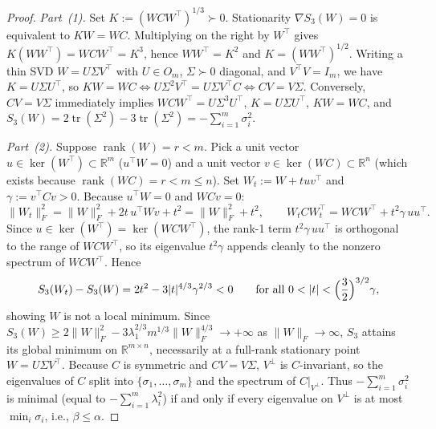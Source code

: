 \documentclass[11pt]{article}
\theoremstyle{plain}
\theoremstyle{definition}
\theoremstyle{remark}
\DeclareMathOperator{\tr}{tr}
\DeclareMathOperator{\rank}{rank}
\begin{document}
\begin{proof}
\emph{Part~(1).} Set $K := (WCW^\top)^{1/3} \succ 0$. Stationarity $\nabla S_3(W) = 0$ is equivalent to $KW = WC$. Multiplying on the right by $W^\top$ gives $K(WW^\top) = WCW^\top = K^3$, hence $WW^\top = K^2$ and $K = (WW^\top)^{1/2}$. Writing a thin SVD $W = U \Sigma V^\top$ with $U \in O_m$, $\Sigma \succ 0$ diagonal, and $V^\top V = I_m$, we have $K = U\Sigma U^\top$, so $KW = WC \iff U\Sigma^2 V^\top = U\Sigma V^\top C \iff CV = V\Sigma$. Conversely, $CV = V\Sigma$ immediately implies $WCW^\top = U\Sigma^3 U^\top$, $K = U\Sigma U^\top$, $KW = WC$, and $S_3(W) = 2\tr(\Sigma^2) - 3\tr(\Sigma^2) = -\sum_{i=1}^m \sigma_i^2$.

\emph{Part~(2).} Suppose $\rank(W) = r < m$. Pick a unit vector $u \in \ker(W^\top) \subset \mathbb{R}^m$ ($u^\top W = 0$) and a unit vector $v \in \ker(WC) \subset \mathbb{R}^n$ (which exists because $\rank(WC) = r < m \le n$). Set $W_t := W + t u v^\top$ and $\gamma := v^\top C v > 0$. Because $u^\top W = 0$ and $WCv = 0$:
\[
\|W_t\|_F^2 = \|W\|_F^2 + 2t\,u^\top W v + t^2 = \|W\|_F^2 + t^2,
\qquad
W_t C W_t^\top = W C W^\top + t^2 \gamma\, u u^\top.
\]
Since $u \in \ker(W^\top) = \ker(WCW^\top)$, the rank-1 term $t^2 \gamma\, uu^\top$ is orthogonal to the range of $WCW^\top$, so its eigenvalue $t^2 \gamma$ appends cleanly to the nonzero spectrum of $WCW^\top$. Hence
\[
S_3(W_t) - S_3(W) = 2t^2 - 3|t|^{4/3}\gamma^{2/3} < 0
\qquad \text{for all } 0 < |t| < \Bigl(\frac{3}{2}\Bigr)^{3/2}\gamma,
\]
showing $W$ is not a local minimum. Since $S_3(W) \ge 2\|W\|_F^2 - 3\lambda_1^{2/3} m^{1/3} \|W\|_F^{4/3} \to +\infty$ as $\|W\|_F \to \infty$, $S_3$ attains its global minimum on $\mathbb{R}^{m \times n}$, necessarily at a full-rank stationary point $W = U\Sigma V^\top$. Because $C$ is symmetric and $CV = V\Sigma$, $V^\perp$ is $C$-invariant, so the eigenvalues of $C$ split into $\{\sigma_1, \dots, \sigma_m\}$ and the spectrum of $C|_{V^\perp}$. Thus $-\sum_{i=1}^m \sigma_i^2$ is minimal (equal to $-\sum_{i=1}^m \lambda_i^2$) if and only if every eigenvalue on $V^\perp$ is at most $\min_i \sigma_i$, i.e., $\beta \le \alpha$.


\end{proof}
\end{document}
